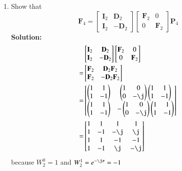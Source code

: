 \documentclass[journal,12pt,twocolumn]{IEEEtran}
\newcommand{\myvec}[1]{\ensuremath{\begin{pmatrix}#1\end{pmatrix}}}
\newcommand{\solution}{\noindent \textbf{Solution: }}
\let\vec\mathbf
\numberwithin{equation}{section}
\renewcommand\thesection{\arabic{section}}
\newcommand{\myvec}[1]{\ensuremath{\begin{pmatrix}#1\end{pmatrix}}}
\newcommand{\mymat}[1]{\ensuremath{\begin{bmatrix}#1\end{bmatrix}}}
\renewcommand\thesection{\arabic{section}}
\begin{document}
\begin{enumerate}[label=\arabic*.,ref=\thesection.\theenumi]
    \item Show that 
\begin{equation}
	\vec{F}_{4}=
\begin{bmatrix}
	\vec{I}_{2} & \vec{D}_{2} \\
\vec{I}_{2} & -\vec{D}_{2}
\end{bmatrix}
\begin{bmatrix}
\vec{F}_{2} & 0 \\
0 & \vec{F}_{2}
\end{bmatrix}
\vec{P}_{4}
\end{equation}
\solution
	\begin{align}
		&\mymat{\vec{I}_2 & \vec{D}_2 \\ \vec{I}_2 & -\vec{D}_2} \mymat{\vec{F}_2 & 0 \\ 0 & \vec{F}_2} \\
		= &\mymat{\vec{F}_2 & \vec{D}_2\vec{F}_2 \\ \vec{F}_2 & -\vec{D}_2\vec{F}_2}  \\
		= &\mymat{\myvec{1&1\\1&-1} & \myvec{1&0\\0&-\j}\myvec{1&1\\1&-1} \\ \myvec{1&1\\1&-1} & - \myvec{1&0\\0&-\j}\myvec{1&1\\1&-1}} \\
		= &\mymat{1 & 1 & 1 & 1 \\ 1 & -1 & -\j & \j \\ 1 & 1 & -1 & -1 \\ 1 & -1 & \j & -\j}
	\end{align}		
	because $W_2^0 = 1$ and $W_2^1 = e^{-\j\pi} = -1$
	

\end{enumerate}
\end{document}
